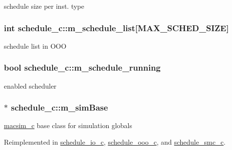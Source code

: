 \label{classschedule__c_a3d8d6881abaa41ccccf6f173a23cc2bd}
schedule size per inst. type \hypertarget{classschedule__c_adf653bc23f928cd4bed7db1200b53483}{
\subsubsection[{m\_\-schedule\_\-list}]{\setlength{\rightskip}{0pt plus 5cm}int {\bf schedule\_\-c::m\_\-schedule\_\-list}\mbox{[}{\bf MAX\_\-SCHED\_\-SIZE}\mbox{]}}}
\label{classschedule__c_adf653bc23f928cd4bed7db1200b53483}
schedule list in OOO \hypertarget{classschedule__c_a70ea92418d7c7b8e26a10c187ec0f57e}{
\subsubsection[{m\_\-schedule\_\-running}]{\setlength{\rightskip}{0pt plus 5cm}bool {\bf schedule\_\-c::m\_\-schedule\_\-running}}}
\label{classschedule__c_a70ea92418d7c7b8e26a10c187ec0f57e}
enabled scheduler \hypertarget{classschedule__c_a0db71234050b2c33f454b5d65d458564}{
\subsubsection[{m\_\-simBase}]{$\ast$ {\bf schedule\_\-c::m\_\-simBase}}}
\label{classschedule__c_a0db71234050b2c33f454b5d65d458564}
\hyperlink{classmacsim__c}{macsim\_\-c} base class for simulation globals 

Reimplemented in \hyperlink{classschedule__io__c_a4fd792581e727219c93a1d4ac6707cbd}{schedule\_\-io\_\-c}, \hyperlink{classschedule__ooo__c_a0b06680167ffaa41d348215de2144d29}{schedule\_\-ooo\_\-c}, and \hyperlink{classschedule__smc__c_a40d5c66331f8f72123691ebbb4590f3b}{schedule\_\-smc\_\-c}.

